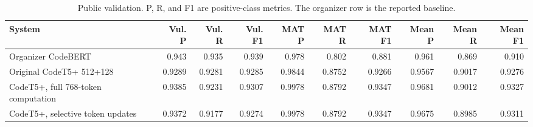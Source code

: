 \begin{table}[t]
\centering
\small\setlength{\tabcolsep}{3pt}
\caption{Public validation. P, R, and F1 are positive-class metrics. The organizer row is the reported baseline.}
\label{tab:validation}
\begin{tabular}{lrrrrrrrrr}
\toprule
System & Vul. P & Vul. R & Vul. F1 & MAT P & MAT R & MAT F1 & Mean P & Mean R & Mean F1 \\
\midrule
Organizer CodeBERT \cite{codebert} & 0.943 & 0.935 & 0.939 & 0.978 & 0.802 & 0.881 & 0.961 & 0.869 & 0.910 \\
Original CodeT5+ 512+128 & 0.9289 & 0.9281 & 0.9285 & 0.9844 & 0.8752 & 0.9266 & 0.9567 & 0.9017 & 0.9276 \\
CodeT5+, full 768-token computation & 0.9385 & 0.9231 & 0.9307 & 0.9978 & 0.8792 & 0.9347 & 0.9681 & 0.9012 & 0.9327 \\
CodeT5+, selective token updates & 0.9372 & 0.9177 & 0.9274 & 0.9978 & 0.8792 & 0.9347 & 0.9675 & 0.8985 & 0.9311 \\
\bottomrule
\end{tabular}
\end{table}
